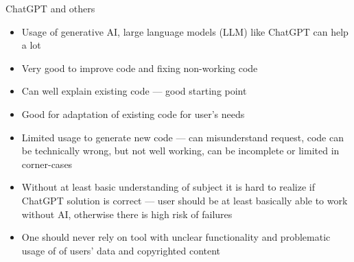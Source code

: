 \documentclass[compress, xelatex, 11pt, xcolor=svgnames, aspectratio=169, url={hyphens, lowtilde}]{beamer}
\begin{document}
\begin{frame}{ChatGPT and others}
	\begin{itemize}
		\item Usage of generative AI, large language models (LLM) like ChatGPT can help a lot
		\item Very good to improve code and fixing non-working code
		\item Can well explain existing code --- good starting point
		\item Good for adaptation of existing code for user's needs
		\item Limited usage to generate new code --- can misunderstand request, code can be technically wrong, but not well working, can be incomplete or limited in corner-cases
		\item Without at least basic understanding of subject it is hard to realize if ChatGPT solution is correct --- user should be at least basically able to work without AI, otherwise there is high risk of failures
		\item One should never rely on tool with unclear functionality and problematic usage of of users' data and copyrighted content
	\end{itemize}
\end{frame}
\end{document}
